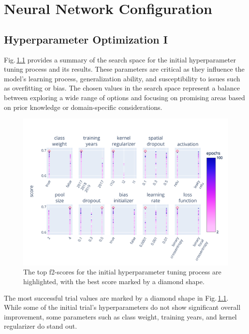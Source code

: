 \chapter{Neural Network Configuration}
\label{chapter:hyper}
\section{Hyperparameter Optimization I}

Fig.\,\ref{fig:hyperband_resnet_params} provides a summary of the search space for the initial hyperparameter tuning process and its results. These parameters are critical as they influence the model's learning process, generalization ability, and susceptibility to issues such as overfitting or bias. The chosen values in the search space represent a balance between exploring a wide range of options and focusing on promising areas based on prior knowledge or domain-specific considerations.

\begin{figure}[ht]
    \centering
    \includegraphics[width=0.9\linewidth, trim={10pt 10pt 15pt 40pt}, clip]{figures/figures_tuner/hyperband_resnet_params.pdf}
    \caption{The top f2-scores for the initial hyperparameter tuning process are highlighted, with the best score marked by a diamond shape.}
    \label{fig:hyperband_resnet_params}
\end{figure}

The most successful trial values are marked by a diamond shape in Fig.\,\ref{fig:hyperband_resnet_params}. While some of the initial trial's hyperparameters do not show significant overall improvement, some parameters such as class weight, training years, and kernel regularizer do stand out. 

